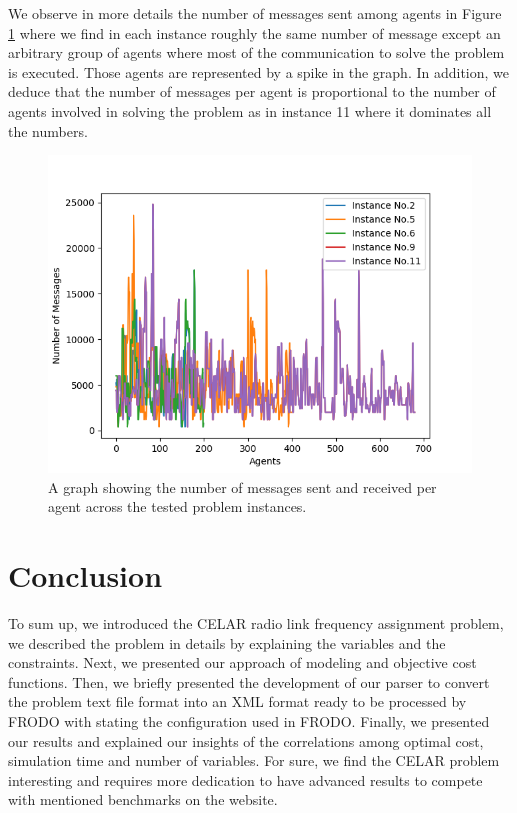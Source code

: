 \documentclass{article}
\begin{document}
	We observe in more details the number of messages sent among agents in Figure \ref{results:messages} where we find in each instance roughly the same number of message except an arbitrary group of agents where most of the communication to solve the problem is executed. Those agents are represented by a spike in the graph. In addition, we deduce that the number of messages per agent is proportional to the number of agents involved in solving the problem as in instance 11 where it dominates all the numbers.
	\begin{figure}
		\centering
		\includegraphics[scale=0.8]{figure/messages.png}
		\caption{A graph showing the number of messages sent and received per agent across the tested problem instances.}
		\label{results:messages}
	\end{figure}

	\section{Conclusion}
	To sum up, we introduced the CELAR radio link frequency assignment problem, we described the problem in details by explaining the variables and the constraints. Next, we presented our approach of modeling and objective cost functions. Then, we briefly presented the development of our parser to convert the problem text file format into an XML format ready to be processed by FRODO with stating the configuration used in FRODO. Finally, we presented our results and explained our insights of the correlations among optimal cost, simulation time and number of variables. For sure, we find the CELAR problem interesting and requires more dedication to have advanced results to compete with mentioned benchmarks on the website.
	\newpage
	
	
\end{document}
